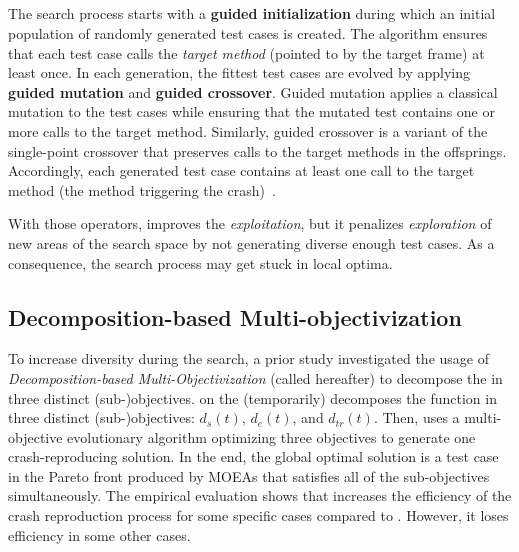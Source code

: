 \subsection{\SGGA}

The search process starts with a \textbf{guided initialization} during which an initial population of randomly generated test cases is created. The algorithm ensures that each test case calls the \textit{target method} (pointed to by the target frame) at least once. 
In each generation, the fittest test cases are evolved by applying \textbf{guided mutation} and \textbf{guided crossover}. Guided mutation applies a classical mutation to the test cases while ensuring that the mutated test contains one or more calls to the target method. 
Similarly, guided crossover is a variant of the single-point crossover that preserves calls to the target methods in the offsprings. Accordingly, each generated test case contains at least one call to the target method (\ie the method triggering the crash)~\cite{Soltani2018a}.

With those operators, \SGGA improves the \emph{exploitation}, but it penalizes \emph{exploration} of new areas of the search space by not generating diverse enough test cases. As a consequence, the search process may get stuck in local optima. 


\subsection{Decomposition-based Multi-objectivization}

To increase diversity during the search, a prior study \cite{Soltani2018b} investigated the usage of \emph{Decomp\-osition-based Multi-Objectivization} (called \decomposition hereafter) to decompose the \CrashFunction in three distinct (sub-)objectives. 
\decomposition on the \CrashFunction (temporarily) decomposes the function in three distinct (sub-)objectives: $d_{s}(t)$, $d_{e}(t)$, and $d_{tr}(t)$. Then, \decomposition uses a multi-objective evolutionary algorithm optimizing three objectives to generate one crash-reproducing solution. 
In the end, the global optimal solution is a test case in the Pareto front produced by MOEAs that satisfies all of the sub-objectives simultaneously.
%
The empirical evaluation shows that \decomposition increases the efficiency of the crash reproduction process for some specific cases compared to \SGGA. However, it loses efficiency in some other cases.

